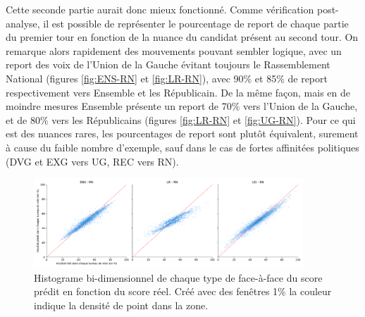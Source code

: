 \documentclass[11pt]{article}
\begin{document}
            Cette seconde partie aurait donc mieux fonctionné. Comme vérification post-analyse, il est possible de représenter le pourcentage de report de chaque partie du premier tour en fonction de la nuance du candidat présent au second tour. On remarque alors rapidement des mouvements pouvant sembler logique, avec un report des voix de l'Union de la Gauche évitant toujours le Rassemblement National (figures \ref{fig:ENS-RN} et \ref{fig:LR-RN}), avec 90\% et 85\% de report respectivement vers Ensemble et les Républicain. De la même façon, mais en de moindre mesures Ensemble présente un report de 70\% vers l'Union de la Gauche, et de 80\% vers les Républicains (figures \ref{fig:LR-RN} et \ref{fig:UG-RN}). Pour ce qui est des nuances rares, les pourcentages de report sont plutôt équivalent, surement à cause du faible nombre d'exemple, sauf dans le cas de fortes affinitées politiques (DVG et EXG vers UG, REC vers RN).

            \begin{figure}
                \begin{center}
                    \includegraphics[width=0.9\textwidth]{Focus_True_Pred_Hist.pdf}
                    \caption{Histograme bi-dimensionnel de chaque type de face-à-face du score prédit en fonction du score réel. Créé avec des fenêtres 1\% la couleur indique la densité de point dans la zone.}
                    \label{fig:Focus_pred_true}
                \end{center}
            \end{figure}
            
\end{document}
